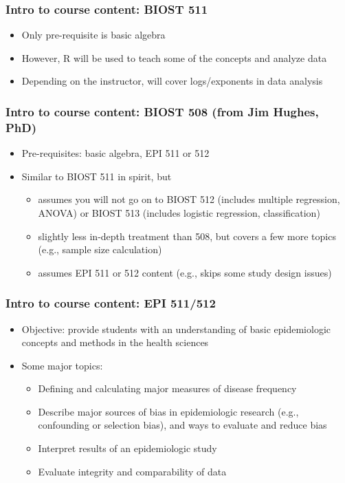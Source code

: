 \documentclass[12pt]{beamer}
\newcommand{\myframe}[1]{\begin{frame} \frametitle{#1}}
\newenvironment{spaceitemize}
{ \begin{itemize}
    \setlength{\itemsep}{10pt}
    \setlength{\parskip}{0pt}
    \setlength{\parsep}{0pt}     }
{ \end{itemize}                  }
\begin{document}
\myframe{Intro to course content: BIOST 511}
\begin{spaceitemize}
\item Only pre-requisite is basic algebra
\item However, R will be used to teach some of the concepts and analyze data
\item Depending on the instructor, will cover logs/exponents in data analysis
\end{spaceitemize}
\end{frame}

\myframe{Intro to course content: BIOST 508 \small (from Jim Hughes, PhD)}
\begin{spaceitemize}
\item Pre-requisites: basic algebra, EPI 511 or 512
\item Similar to BIOST 511 in spirit, but 
\begin{spaceitemize}
\item assumes you will not go on to BIOST 512 (includes multiple regression, ANOVA) or BIOST 513 (includes logistic regression, classification)
\item slightly less in-depth treatment than 508, but covers a few more topics (e.g., sample size calculation)
\item assumes EPI 511 or 512 content (e.g., skips some study design issues)
\end{spaceitemize}
\end{spaceitemize}
\end{frame}
\myframe{Intro to course content: EPI 511/512}
\begin{spaceitemize}
\item Objective: provide students with an understanding of basic epidemiologic concepts and methods in the health sciences 
\item Some major topics:
\begin{spaceitemize}
\item Defining and calculating major measures of disease frequency
\item Describe major sources of bias in epidemiologic research (e.g., confounding or selection bias), and ways to evaluate and reduce bias
\item Interpret results of an epidemiologic study
\item Evaluate integrity and comparability of data
\end{spaceitemize}
\end{spaceitemize}
\end{frame}
\end{document}
